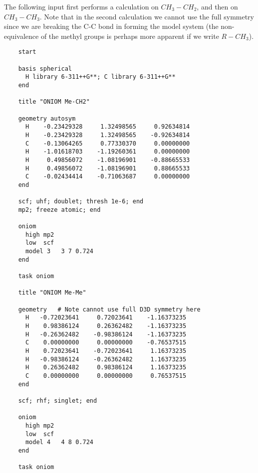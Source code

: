 The following input first performs a calculation on $CH_3-CH_2$, and then
on $CH_3-CH_3$.  Note that in the second calculation we cannot use the
full symmetry since we are breaking the C-C bond in forming the model
system (the non-equivalence of the methyl groups is perhaps more
apparent if we write $R-CH_3$).

\begin{verbatim}
    start

    basis spherical
      H library 6-311++G**; C library 6-311++G**
    end

    title "ONIOM Me-CH2"

    geometry autosym
      H    -0.23429328     1.32498565     0.92634814
      H    -0.23429328     1.32498565    -0.92634814
      C    -0.13064265     0.77330370     0.00000000
      H    -1.01618703    -1.19260361     0.00000000
      H     0.49856072    -1.08196901    -0.88665533
      H     0.49856072    -1.08196901     0.88665533
      C    -0.02434414    -0.71063687     0.00000000
    end

    scf; uhf; doublet; thresh 1e-6; end
    mp2; freeze atomic; end

    oniom
      high mp2
      low  scf
      model 3   3 7 0.724
    end

    task oniom

    title "ONIOM Me-Me"

    geometry   # Note cannot use full D3D symmetry here
      H   -0.72023641     0.72023641    -1.16373235
      H    0.98386124     0.26362482    -1.16373235
      H   -0.26362482    -0.98386124    -1.16373235
      C    0.00000000     0.00000000    -0.76537515
      H    0.72023641    -0.72023641     1.16373235
      H   -0.98386124    -0.26362482     1.16373235
      H    0.26362482     0.98386124     1.16373235
      C    0.00000000     0.00000000     0.76537515
    end

    scf; rhf; singlet; end

    oniom
      high mp2
      low  scf
      model 4   4 8 0.724
    end

    task oniom
\end{verbatim}




